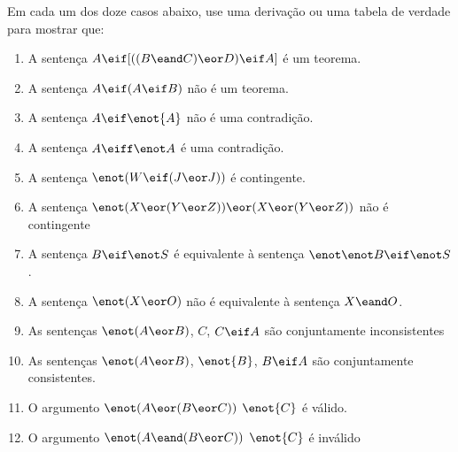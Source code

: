 \practiceproblems
\noindent\problempart Em cada um dos doze casos abaixo, use uma  derivação ou uma tabela de verdade para mostrar que: 
\begin{enumerate}%
\item  A sentença $A \eif [((B \eand C) \eor D) \eif A]$  é um teorema.
\item  A sentença $A \eif (A \eif B)$  não é um teorema.
\item  A sentença $A \eif \enot{A}$ não é uma contradição. 
\item  A sentença $A \eiff \enot A$ é uma contradição.  
\item  A sentença $ \enot (W \eif (J \eor J)) $  é contingente.
\item  A sentença $ \enot(X \eor (Y \eor Z)) \eor (X \eor (Y \eor Z))$  não é contingente
\item  A sentença $B \eif \enot S$  é equivalente à sentença $\enot \enot B \eif \enot S$.
\item  A sentença $ \enot (X \eor O) $ não é equivalente à sentença $X \eand O$.
\item  As sentenças $\enot(A \eor B)$, $C$, $C \eif A$  são conjuntamente inconsistentes
\item  As sentenças $\enot(A \eor B)$, $\enot{B}$, $B \eif A$ são conjuntamente consistentes.
\item  O argumento $\enot(A \eor (B \eor C)) $ \therefore $ \enot{C}$ é válido.
\item  O argumento $\enot(A \eand (B \eor C))$ \therefore $ \enot{C}$ é  inválido
\end{enumerate}


